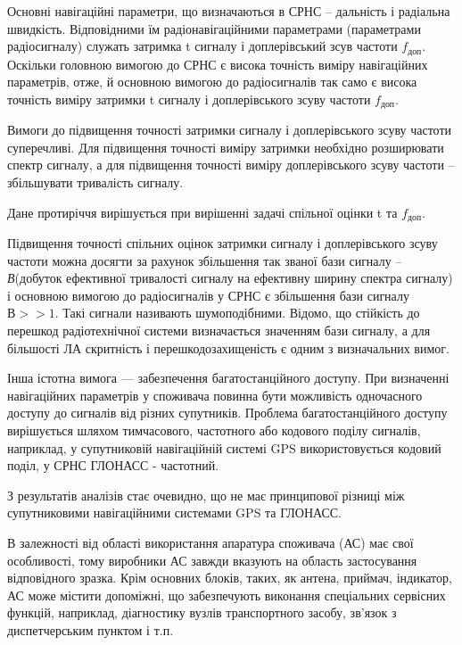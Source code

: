 Основні навігаційні параметри, що визначаються в СРНС -- дальність і радіальна швидкість. Відповідними 
їм радіонавігаційними параметрами (параметрами радіосигналу) служать затримка t сигналу і доплерівський 
зсув частоти $f_\text{доп}$. Оскільки головною вимогою до СРНС є висока точність виміру 
навігаційних параметрів, отже, й основною вимогою до радіосигналів так само є висока точність 
виміру затримки t сигналу і доплерівського зсуву частоти $f_\text{доп}$.

Вимоги до підвищення точності затримки сигналу і доплерівського зсуву частоти суперечливі. 
Для підвищення точності виміру затримки необхідно розширювати спектр сигналу, а для підвищення 
точності виміру  доплерівського зсуву частоти --  збільшувати тривалість сигналу.

Дане протиріччя вирішується при вирішенні задачі спільної оцінки t та  $f_\text{доп}$.

Підвищення точності спільних оцінок затримки сигналу і доплерівського зсуву частоти можна 
досягти за рахунок збільшення так званої  бази сигналу -- \textit{В}(добуток ефективної 
тривалості сигналу на ефективну ширину спектра сигналу) і основною вимогою до радіосигналів у 
СРНС є збільшення бази сигналу $В>>1$. Такі сигнали називають шумоподібними. 
Відомо, що стійкість до перешкод радіотехнічної системи визначається значенням бази сигналу, 
а для більшості ЛА скритність і перешкодозахищеність є одним з визначальних вимог. 

Інша істотна вимога --- забезпечення багатостанційного доступу. При визначенні навігаційних 
параметрів у споживача повинна бути можливість одночасного доступу до сигналів від різних 
супутників. Проблема багатостанційного доступу вирішується шляхом тимчасового, частотного 
або кодового поділу сигналів, наприклад, у супутниковій навігаційній системі GPS використовується 
кодовий поділ, у СРНС ГЛОНАСС - частотний.

З результатів аналізів стає очевидно, що не має принципової різниці між супутниковими 
навігаційними системами GPS та ГЛОНАСС.

В залежності від області використання апаратура споживача (АС) має свої особливості, 
тому виробники АС завжди вказують на область застосування відповідного зразка. Крім 
основних блоків, таких, як антена, приймач, індикатор, АС може містити допоміжні, що 
забезпечують виконання спеціальних сервісних функцій, наприклад, діагностику вузлів 
транспортного засобу, зв'язок з диспетчерським пунктом і т.п.

